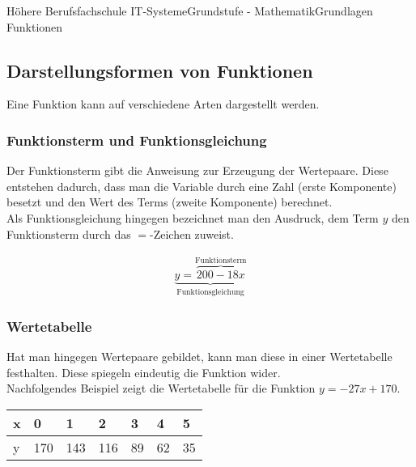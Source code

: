 \documentclass[11pt,twocolumn,oneside,openany,headings=optiontotoc,11pt,numbers=noenddot]{article}
\begin{document}
\begin{worksheet}{Höhere Berufsfachschule IT-Systeme}{Grundstufe - Mathematik}{Grundlagen Funktionen}
		\subsection{Darstellungsformen von Funktionen}
		Eine Funktion kann auf verschiedene Arten dargestellt werden.
		\subsubsection*{Funktionsterm und Funktionsgleichung}
		Der Funktionsterm gibt die Anweisung zur Erzeugung der Wertepaare. Diese entstehen dadurch, dass man die Variable durch eine Zahl (erste Komponente) besetzt und den Wert des Terms (zweite Komponente) berechnet.\\
		Als Funktionsgleichung hingegen bezeichnet man den Ausdruck, dem Term \(y\) den Funktionsterm durch das \glqq{}\(=\)\grqq{}-Zeichen zuweist.\\
		\par\bigskip\noindent
		\begin{align*}
			\underbrace{y = \overbrace{200 -18x}^{\text{Funktionsterm}}}_{\text{Funktionsgleichung}}
		\end{align*}
		\subsubsection*{Wertetabelle}
		Hat man hingegen Wertepaare gebildet, kann man diese in einer Wertetabelle festhalten. Diese spiegeln eindeutig die Funktion wider.\\
		Nachfolgendes Beispiel zeigt die Wertetabelle für die Funktion \(y = -27x+170\).\\
		\par\bigskip\noindent
		\begin{tabularx}{0.5\textwidth}{|l|X|X|X|X|X|X|}
			\hline
			x & 0 & 1 & 2 & 3 & 4 & 5\\
			\hline
			y & 170 & 143 & 116 & 89 & 62 & 35\\
			\hline
		\end{tabularx}

\end{worksheet}
\end{document}
